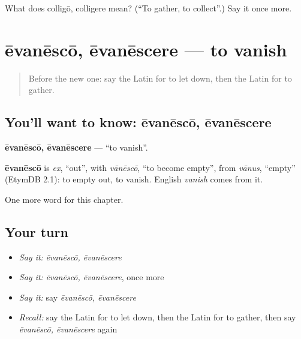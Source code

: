 \begin{tcolorbox}[breakable,colback=teal!4,colframe=teal!35!black,title={Before you move on}]
What does colligō, colligere mean? (\textquotedblleft{}To gather, to collect\textquotedblright{}.) Say it once more.
\end{tcolorbox}
\section[ēvanēscō, ēvanēscere]{ēvanēscō, ēvanēscere — to vanish}

\label{lesson:LA-C234-evanesco}



\begin{quote}
Before the new one: say the Latin for to let down, then the Latin for to gather.
\end{quote}

\subsection*{You'll want to know: ēvanēscō, ēvanēscere}
\textbf{ēvanēscō, ēvanēscere} — \textquotedblleft{}to vanish\textquotedblright{}.

\begin{cousinweb}
\textbf{ēvanēscō} is \emph{ex}, \textquotedblleft{}out\textquotedblright{}, with \emph{vānēscō}, \textquotedblleft{}to become empty\textquotedblright{}, from \emph{vānus}, \textquotedblleft{}empty\textquotedblright{} (EtymDB 2.1): to empty out, to vanish. English \emph{vanish} comes from it.
\end{cousinweb}

\begin{grammarlens}[title={What you've built}]
One more word for this chapter.
\end{grammarlens}

\subsection*{Your turn}
\begin{itemize}
\raggedright
  \item \emph{Say it:} \emph{ēvanēscō, ēvanēscere}
  \item \emph{Say it:} \emph{ēvanēscō, ēvanēscere}, once more
  \item \emph{Say it:} say \emph{ēvanēscō, ēvanēscere}
  \item \emph{Recall:} say the Latin for to let down, then the Latin for to gather, then say \emph{ēvanēscō, ēvanēscere} again
\end{itemize}


